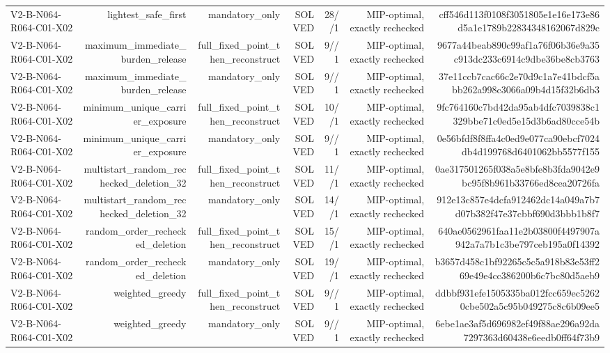 {\begin{longtable}{lrrrrrr}
V2-B-N064-R064-C01-X02 & lightest\_safe\_first & mandatory\_only & SOLVED & 28//1 & MIP-optimal, exactly rechecked & cff546d113f0108f3051805e1e16e173e86d5a1e1789b22834348162067d829c \\
V2-B-N064-R064-C01-X02 & maximum\_immediate\_burden\_release & full\_fixed\_point\_then\_reconstruct & SOLVED & 9//1 & MIP-optimal, exactly rechecked & 9677a44beab890c99af1a76f06b36e9a35c913dc233c6914c9dbe36be8cb3763 \\
V2-B-N064-R064-C01-X02 & maximum\_immediate\_burden\_release & mandatory\_only & SOLVED & 9//1 & MIP-optimal, exactly rechecked & 37e11ccb7cac66c2e70d9c1a7e41bdcf5abb262a998c3066a09b4d15f32b6db3 \\
V2-B-N064-R064-C01-X02 & minimum\_unique\_carrier\_exposure & full\_fixed\_point\_then\_reconstruct & SOLVED & 10//1 & MIP-optimal, exactly rechecked & 9fc764160c7bd42da95ab4dfc7039838c1329bbe71c0ed5e15d3b6ad80cce54b \\
V2-B-N064-R064-C01-X02 & minimum\_unique\_carrier\_exposure & mandatory\_only & SOLVED & 9//1 & MIP-optimal, exactly rechecked & 0e56bfdf8f8ffa4c0ed9e077ca90ebcf7024db4d199768d6401062bb5577f155 \\
V2-B-N064-R064-C01-X02 & multistart\_random\_rechecked\_deletion\_32 & full\_fixed\_point\_then\_reconstruct & SOLVED & 11//1 & MIP-optimal, exactly rechecked & 0ae317501265f038a5e8bfe8b3fda9042e9bc95f8b961b33766ed8cea20726fa \\
V2-B-N064-R064-C01-X02 & multistart\_random\_rechecked\_deletion\_32 & mandatory\_only & SOLVED & 14//1 & MIP-optimal, exactly rechecked & 912e13c857e4dcfa912462dc14a049a7b7d07b382f47e37cbbf690d3bbb1b8f7 \\
V2-B-N064-R064-C01-X02 & random\_order\_rechecked\_deletion & full\_fixed\_point\_then\_reconstruct & SOLVED & 15//1 & MIP-optimal, exactly rechecked & 640ae0562961faa11e2b03800f4497907a942a7a7b1c3be797ceb195a0f14392 \\
V2-B-N064-R064-C01-X02 & random\_order\_rechecked\_deletion & mandatory\_only & SOLVED & 19//1 & MIP-optimal, exactly rechecked & b3657d458c1bf92265c5c5a918b83e53ff269e49e4cc386200b6c7bc80d5aeb9 \\
V2-B-N064-R064-C01-X02 & weighted\_greedy & full\_fixed\_point\_then\_reconstruct & SOLVED & 9//1 & MIP-optimal, exactly rechecked & ddbbf931efe1505335ba012fcc659ec52620cbe502a5c95b049275c8c6b09ee5 \\
V2-B-N064-R064-C01-X02 & weighted\_greedy & mandatory\_only & SOLVED & 9//1 & MIP-optimal, exactly rechecked & 6ebe1ae3af5d696982ef49f88ae296a92da7297363d60438e6eedb0ff64f73b9 \\

\end{longtable}}
